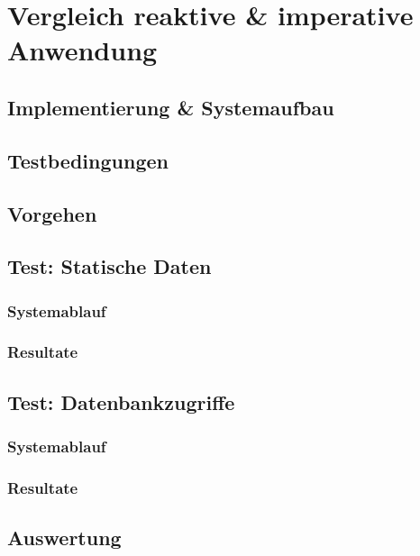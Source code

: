 
\section {Vergleich reaktive \& imperative Anwendung}
\label{section:vergleich_reaktiv_imperativ}

\subsection{Implementierung \& Systemaufbau}
\label{section:implementierung}

\subsection{Testbedingungen}
\label{section:testbedingungen}

\subsection{Vorgehen}
\label{section:vorgehen}

\subsection{Test: Statische Daten}
\label{section:statische_daten}

\subsubsection{Systemablauf}

\subsubsection{Resultate}

\subsection{Test: Datenbankzugriffe}
\label{section:datenbankzugriffe}

\subsubsection{Systemablauf}

\subsubsection{Resultate}

\subsection{Auswertung}
\label{section:auswertung}